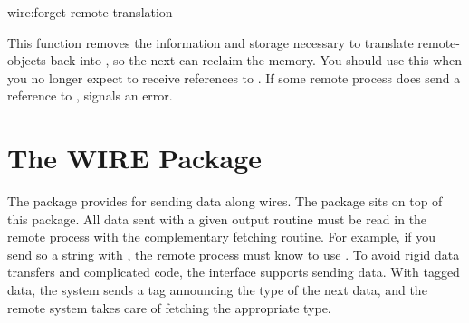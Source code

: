\begin{defun}{wire:}{forget-remote-translation}{}
  
  This function removes the information and storage necessary to
  translate remote-objects back into , so the next
   can reclaim the memory.  You should use this when you no
  longer expect to receive references to .  If some remote
  process does send a reference to ,
   signals an error.
\end{defun}




  




\section{The WIRE Package}

The  package provides for sending data along wires.  The
 package sits on top of this package.  All data sent
with a given output routine must be read in the remote process with
the complementary fetching routine.  For example, if you send so a
string with , the remote process must know
to use .  To avoid rigid data transfers and
complicated code, the interface supports sending
 data.  With tagged data, the system sends a tag
announcing the type of the next data, and the remote system takes
care of fetching the appropriate type.

